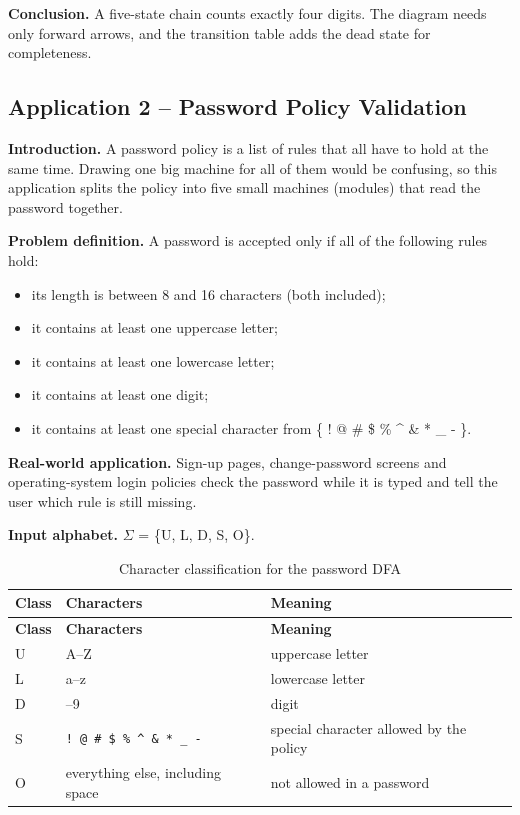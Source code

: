 \documentclass[12pt,a4paper]{article}
\begin{document}
\textbf{Conclusion.} A five-state chain counts exactly four digits. The diagram needs only forward arrows, and the transition table adds the dead state for completeness.

\subsection{Application 2 -- Password Policy Validation}

\textbf{Introduction.} A password policy is a list of rules that all have to hold at the same time. Drawing one big machine for all of them would be confusing, so this application splits the policy into five small machines (modules) that read the password together.

\textbf{Problem definition.} A password is accepted only if all of the following rules hold:

\begin{itemize}
\item its length is between 8 and 16 characters (both included);
\item it contains at least one uppercase letter;
\item it contains at least one lowercase letter;
\item it contains at least one digit;
\item it contains at least one special character from \{ ! @ \# \$ \% \textasciicircum{} \& * \_ - \}.
\end{itemize}

\textbf{Real-world application.} Sign-up pages, change-password screens and operating-system login policies check the password while it is typed and tell the user which rule is still missing.

\textbf{Input alphabet.} \ensuremath{\Sigma} = \{U, L, D, S, O\}.

{\small
\begin{longtable}{|>{\centering\arraybackslash}p{}|>{\raggedright\arraybackslash}p{}|>{\raggedright\arraybackslash}p{}|}
\caption[Character classification for the password DFA]{Character classification for the password DFA}\label{tab:pw_classes}\\
\hline
\rowcolor{hdr}\textbf{Class} & \textbf{Characters} & \textbf{Meaning}\\ \hline
\endfirsthead
\hline
\rowcolor{hdr}\textbf{Class} & \textbf{Characters} & \textbf{Meaning}\\ \hline
\endhead
U & A--Z & uppercase letter\\ \hline
L & a--z & lowercase letter\\ \hline
D & 0--9 & digit\\ \hline
S & \texttt{! @ \# \$ \% \textasciicircum{} \& * \_ {-}} & special character allowed by the policy\\ \hline
O & everything else, including space & not allowed in a password\\ \hline
\end{longtable}}
\end{document}

